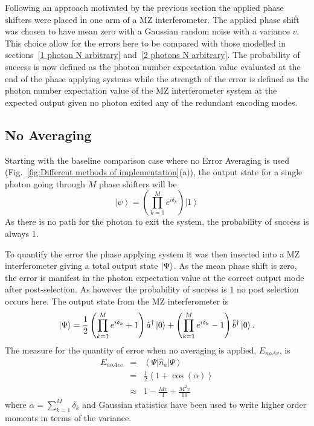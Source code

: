 \documentclass[aps,pra,twocolumn,superscriptaddress,numerical,floatfix]{revtex4-1}
\begin{document}
Following an approach motivated by the previous section the applied phase shifters were placed in one arm of a MZ interferometer. The applied phase shift was chosen to have mean zero with a Gaussian random noise with a variance $v$. This choice allow for the errors here to be compared with those modelled in sections~\ref{1 photon N arbitrary} and~\ref{2 photons N arbitrary}. The probability of success is now defined as the photon number expectation value evaluated at the end of the phase applying systems while the strength of the error is defined as the photon number expectation value of the MZ interferometer system at the expected output given no photon exited any of the redundant encoding modes. 


\subsection{No Averaging\label{No Averaging}}

Starting with the baseline comparison case where no Error Averaging is used (Fig.~\ref{fig:Different methods of implementation}(a)), the output state for a single photon going through $M$ phase shifters will be
\begin{equation}
\left|\psi\right\rangle =\left(\prod_{k=1}^{M}e^{i\delta_{k}}\right)\left|1\right\rangle \label{eq:noAvPhaseState}
\end{equation}
As there is no path for the photon to exit the system, the probability of success is always $1$.

To quantify the error the phase applying system it was then inserted into a MZ interferometer giving a total output state $\ket{\Psi}$.  As the mean phase shift is zero, the error is manifest in the photon expectation value at the correct output mode after post-selection. As however the probability of success is $1$ no post selection occurs here.  The output state from the MZ interferometer is
\begin{equation}
	\ket{\Psi} =\frac{1}{2}\left(\prod_{k=1}^{M}e^{i\delta_{k}}+1\right)\hat{a}^{\dagger}\ket{0}+\left(\prod_{k=1}^{M}e^{i\delta_{k}}-1\right)\hat{b}^{\dagger}\ket{0}. \label{eq:noAveIntState}
\end{equation}
The measure for the quantity of error when no averaging is applied, $E_{noAv}$, is
\begin{eqnarray}
E_{noAve} & = & \left\langle \Psi\right|\hat{n}_{a}\left|\Psi\right\rangle \nonumber \\
& = & \frac{1}{2}\left\langle 1+\cos\left(\alpha\right)\right\rangle \nonumber \\
& \approx & 1-\frac{Mv}{4}+\frac{M^{2}v}{16}\label{eq:ErrorNoAv1}
\end{eqnarray}
where $\alpha=\sum_{k=1}^{M}\delta_{k}$ and Gaussian statistics have been used to write higher order moments in terms of the variance.
\end{document}
